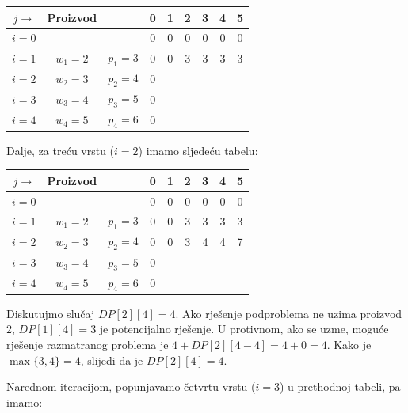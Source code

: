    \begin{table}[H]
 	\centering
 	\begin{tabular}{|c|cc|cccccc|}\hline
 		
 	$j\rightarrow$	& Proizvod   &              &	 	0	&1&	2	&3	&4	&5 \\ \hline
 		
 		$i=0$ & 	& 	    & 	    0	&0	&0	&0	&0	&0  \\
 		$i=1$ &	$w_1=2$	&$p_1=3$ &	0	&0 	&3 	&3 	&3 	&3\\ 
 		$i=2$ &	$w_2=3$	&$p_2=4$ &	0   &	& 	& 	&	&\\	 
 		$i=3$ &	$w_3=4$	&$p_3=5$ &	0	& 	& 	& 	& 	&\\ 
 		$i=4$ &	$w_4=5$ &$p_4=6$ &	0	& 	& 	& 	& 	&\\ \hline
 	\end{tabular}
 \end{table}
  
  Dalje, za treću vrstu ($i=2$) imamo sljedeću tabelu: 
  
   
  \begin{table}[H]
  	\centering
  	\begin{tabular}{|c|cc|cccccc|}\hline
  		
  		$j\rightarrow$	& Proizvod   &              &	 	0	&1&	2	&3	&4	&5 \\ \hline
  		
  		$i=0$ & 	& 	    & 	    0	&0	&0	&0	&0	&0  \\
  		$i=1$ &	$w_1=2$	&$p_1=3$ &	0	&0 	&3 	&3 	&3 	&3\\ 
  		$i=2$ &	$w_2=3$	&$p_2=4$ &	0   &0	&3 	&4 	&4	&7\\	 
  		$i=3$ &	$w_3=4$	&$p_3=5$ &	0	& 	& 	& 	& 	&\\ 
  		$i=4$ &	$w_4=5$ &$p_4=6$ &	0	& 	& 	& 	& 	&\\ \hline
  	\end{tabular}
  \end{table}
Diskutujmo slučaj $DP[2][4]=4$. Ako rješenje podproblema ne uzima proizvod 2, $DP[1][4]=3$ je potencijalno rješenje. U protivnom, ako se uzme, moguće rješenje razmatranog problema je $4 + DP[2][4-4] = 4 + 0 = 4$. Kako je $\max\{3, 4\}= 4$, slijedi da je $DP[2][4] = 4$.


  Narednom iteracijom, popunjavamo četvrtu vrstu ($i=3$) u prethodnoj tabeli, pa imamo: 

